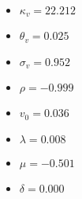
\begin{itemize}
    \item $\kappa_v = 22.212$
    \item $\theta_v = 0.025$
    \item $\sigma_v = 0.952$
    \item $\rho = -0.999$
    \item $v_0 = 0.036$
    \item $\lambda = 0.008$
    \item $\mu = -0.501$
    \item $\delta = 0.000$
\end{itemize}
